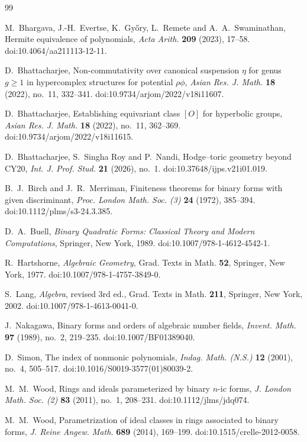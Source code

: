 \documentclass[11pt]{amsart}
\theoremstyle{definition}
\begin{document}
\begin{thebibliography}{99}

 M.~Bhargava, J.-H.~Evertse, K.~Gy\H{o}ry, L.~Remete and A.~A.~Swaminathan, Hermite equivalence of polynomials, \emph{Acta Arith.} \textbf{209} (2023), 17--58. doi:10.4064/aa211113-12-11.

 D.~Bhattacharjee, Non-commutativity over canonical suspension $\eta$ for genus $g\ge1$ in hypercomplex structures for potential $\rho\phi$, \emph{Asian Res. J. Math.} \textbf{18} (2022), no.~11, 332--341. doi:10.9734/arjom/2022/v18i11607.

 D.~Bhattacharjee, Establishing equivariant class $[O]$ for hyperbolic groups, \emph{Asian Res. J. Math.} \textbf{18} (2022), no.~11, 362--369. doi:10.9734/arjom/2022/v18i11615.

 D.~Bhattacharjee, S.~Singha Roy and P.~Nandi, Hodge--toric geometry beyond CY20, \emph{Int. J. Prof. Stud.} \textbf{21} (2026), no.~1. doi:10.37648/ijps.v21i01.019.

 B.~J.~Birch and J.~R.~Merriman, Finiteness theorems for binary forms with given discriminant, \emph{Proc. London Math. Soc. (3)} \textbf{24} (1972), 385--394. doi:10.1112/plms/s3-24.3.385.

 D.~A.~Buell, \emph{Binary Quadratic Forms: Classical Theory and Modern Computations}, Springer, New York, 1989. doi:10.1007/978-1-4612-4542-1.

 R.~Hartshorne, \emph{Algebraic Geometry}, Grad. Texts in Math. \textbf{52}, Springer, New York, 1977. doi:10.1007/978-1-4757-3849-0.

 S.~Lang, \emph{Algebra}, revised 3rd ed., Grad. Texts in Math. \textbf{211}, Springer, New York, 2002. doi:10.1007/978-1-4613-0041-0.

 J.~Nakagawa, Binary forms and orders of algebraic number fields, \emph{Invent. Math.} \textbf{97} (1989), no.~2, 219--235. doi:10.1007/BF01389040.

 D.~Simon, The index of nonmonic polynomials, \emph{Indag. Math. (N.S.)} \textbf{12} (2001), no.~4, 505--517. doi:10.1016/S0019-3577(01)80039-2.

 M.~M.~Wood, Rings and ideals parameterized by binary $n$-ic forms, \emph{J. London Math. Soc. (2)} \textbf{83} (2011), no.~1, 208--231. doi:10.1112/jlms/jdq074.

 M.~M.~Wood, Parametrization of ideal classes in rings associated to binary forms, \emph{J. Reine Angew. Math.} \textbf{689} (2014), 169--199. doi:10.1515/crelle-2012-0058.

\end{thebibliography}
\end{document}
